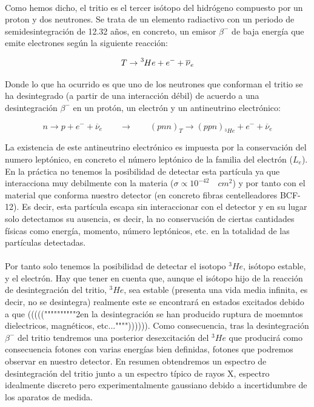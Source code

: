 \documentclass[11pt, a4paper]{article}
\begin{document}
\paragraph {}
Como hemos dicho, el tritio es el tercer isótopo del hidrógeno compuesto por un proton y dos neutrones. Se trata de un elemento radiactivo con un periodo de semidesintegración de 12.32 años, en concreto, un emisor $\beta^-$ de baja energía que emite electrones según la siguiente reacción:

$$T \rightarrow \ce{^{3}{He}} + e^- + \overline{\nu}_e$$

Donde lo que ha ocurrido es que uno de los neutrones que conforman el tritio se ha desintegrado (a partir de una interacción débil) de acuerdo a una desintegración $\beta^-$ en un protón, un electrón y un antineutrino electrónico:

$$n \rightarrow p + e^- + \overline{\nu}_e \qquad \rightarrow \qquad (pnn)_T\rightarrow (ppn)_{^3He} + e^- + \overline{\nu}_e $$

La existencia de este antineutrino electrónico es impuesta por la conservación del numero leptónico, en concreto el número leptónico de la familia del electrón ($L_e$). En la práctica no tenemos la posibilidad de detectar esta partícula ya que interacciona muy debilmente con la materia ($\sigma \propto 10^{-42} \quad cm^2$) y por tanto con el material que conforma nuestro detector (en concreto fibras centelleadores BCF-12). Es decir, esta partícula escapa sin interaccionar con el detector y en su lugar solo detectamos su ausencia, es decir, la no conservación de ciertas cantidades físicas como energía, momento, número leptónicos, etc. en la totalidad de las partículas detectadas.

\paragraph {}
Por tanto solo tenemos la posibilidad de detectar el isotopo $^3He$, isótopo estable, y el electrón. Hay que tener en cuenta que, aunque el isótopo hijo de la reacción de desintegración del tritio, $^3He$, sea estable (presenta una vida media infinita, es decir, no se desintegra) realmente este se encontrará en estados excitados debido a que (((((""""""""""2en la desintegración se han producido ruptura de moemntos dielectricos, magnéticos, etc..."""")))))). Como consecuencia, tras la desintegración $\beta^-$ del tritio tendremos una posterior desexcitación del $^3He$ que producirá como consecuencia fotones con varias energías bien definidas, fotones que podremos observar en nuestro detector. En resumen obtendremos un espectro de desintegración del tritio junto a un espectro típico de rayos X, espectro idealmente discreto pero experimentalmente gaussiano debido a incertidumbre de los aparatos de medida.
\end{document}
